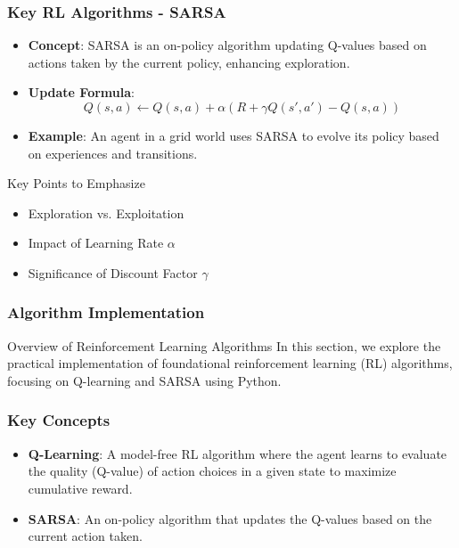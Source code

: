 \documentclass[aspectratio=169]{beamer}
\begin{document}
\begin{frame}[fragile]
    \frametitle{Key RL Algorithms - SARSA}
    \begin{itemize}
        \item \textbf{Concept}: SARSA is an on-policy algorithm updating Q-values based on actions taken by the current policy, enhancing exploration.
        \item \textbf{Update Formula}:
        \begin{equation}
            Q(s, a) \leftarrow Q(s, a) + \alpha \left( R + \gamma Q(s', a') - Q(s, a) \right)
        \end{equation}
        \item \textbf{Example}: An agent in a grid world uses SARSA to evolve its policy based on experiences and transitions.
    \end{itemize}
    
    \begin{block}{Key Points to Emphasize}
        \begin{itemize}
            \item Exploration vs. Exploitation
            \item Impact of Learning Rate \( \alpha \)
            \item Significance of Discount Factor \( \gamma \)
        \end{itemize}
    \end{block}
\end{frame}

\begin{frame}
    \frametitle{Algorithm Implementation}
    \begin{block}{Overview of Reinforcement Learning Algorithms}
        In this section, we explore the practical implementation of foundational reinforcement learning (RL) algorithms, focusing on Q-learning and SARSA using Python.
    \end{block}
\end{frame}

\begin{frame}
    \frametitle{Key Concepts}
    \begin{itemize}
        \item \textbf{Q-Learning}: A model-free RL algorithm where the agent learns to evaluate the quality (Q-value) of action choices in a given state to maximize cumulative reward.
        \item \textbf{SARSA}: An on-policy algorithm that updates the Q-values based on the current action taken.
    \end{itemize}
\end{frame}
\end{document}
